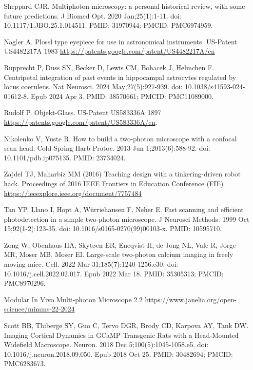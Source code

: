 \documentclass[10pt,letterpaper]{article}
\begin{document}
\begin{thebibliography}{10}
Sheppard CJR. Multiphoton microscopy: a personal historical review, with some future predictions. J Biomed Opt. 2020 Jan;25(1):1-11. doi: 10.1117/1.JBO.25.1.014511. PMID: 31970944; PMCID: PMC6974959.

Nagler A. Plossl type eyepiece for use in astronomical instruments. US-Patent US4482217A 1983
\url{https://patents.google.com/patent/US4482217A/en}

Rupprecht P, Duss SN, Becker D, Lewis CM, Bohacek J, Helmchen F. Centripetal integration of past events in hippocampal astrocytes regulated by locus coeruleus. Nat Neurosci. 2024 May;27(5):927-939. doi: 10.1038/s41593-024-01612-8. Epub 2024 Apr 3. PMID: 38570661; PMCID: PMC11089000.

Rudolf P. Objekt-Glass. US-Patent US583336A 1897 \url{https://patents.google.com/patent/US583336A/en}.

Nikolenko V, Yuste R. How to build a two-photon microscope with a confocal scan head. Cold Spring Harb Protoc. 2013 Jun 1;2013(6):588-92. doi: 10.1101/pdb.ip075135. PMID: 23734024.

Zajdel TJ, Maharbiz MM (2016) Teaching design with a tinkering-driven robot hack. Proceedings of 2016 IEEE Frontiers in Education Conference (FIE) \url{https://ieeexplore.ieee.org/document/7757484}

Tan YP, Llano I, Hopt A, Würriehausen F, Neher E. Fast scanning and efficient photodetection in a simple two-photon microscope. J Neurosci Methods. 1999 Oct 15;92(1-2):123-35. doi: 10.1016/s0165-0270(99)00103-x. PMID: 10595710.

Zong W, Obenhaus HA, Skytøen ER, Eneqvist H, de Jong NL, Vale R, Jorge MR, Moser MB, Moser EI. Large-scale two-photon calcium imaging in freely moving mice. Cell. 2022 Mar 31;185(7):1240-1256.e30. doi: 10.1016/j.cell.2022.02.017. Epub 2022 Mar 18. PMID: 35305313; PMCID: PMC8970296.

Modular In Vivo Multi-photon Microscope 2.2 \url{https://www.janelia.org/open-science/mimms-22-2024}

Scott BB, Thiberge SY, Guo C, Tervo DGR, Brody CD, Karpova AY, Tank DW. Imaging Cortical Dynamics in GCaMP Transgenic Rats with a Head-Mounted Widefield Macroscope. Neuron. 2018 Dec 5;100(5):1045-1058.e5. doi: 10.1016/j.neuron.2018.09.050. Epub 2018 Oct 25. PMID: 30482694; PMCID: PMC6283673.


\end{thebibliography}
\end{document}
